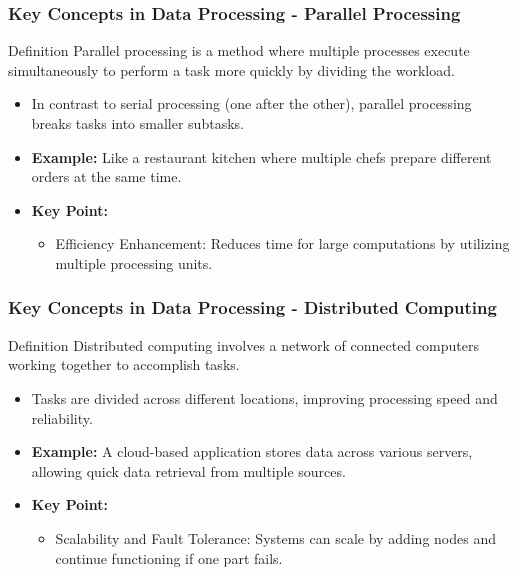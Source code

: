 \documentclass[aspectratio=169]{beamer}
\begin{document}
\begin{frame}[fragile]
    \frametitle{Key Concepts in Data Processing - Parallel Processing}
    \begin{block}{Definition}
        Parallel processing is a method where multiple processes execute simultaneously to perform a task more quickly by dividing the workload.
    \end{block}
    \begin{itemize}
        \item In contrast to serial processing (one after the other), parallel processing breaks tasks into smaller subtasks.
        \item \textbf{Example:} Like a restaurant kitchen where multiple chefs prepare different orders at the same time.
        \item \textbf{Key Point:} 
        \begin{itemize}
            \item Efficiency Enhancement: Reduces time for large computations by utilizing multiple processing units.
        \end{itemize}
    \end{itemize}
\end{frame}

\begin{frame}[fragile]
    \frametitle{Key Concepts in Data Processing - Distributed Computing}
    \begin{block}{Definition}
        Distributed computing involves a network of connected computers working together to accomplish tasks.
    \end{block}
    \begin{itemize}
        \item Tasks are divided across different locations, improving processing speed and reliability.
        \item \textbf{Example:} A cloud-based application stores data across various servers, allowing quick data retrieval from multiple sources.
        \item \textbf{Key Point:}
        \begin{itemize}
            \item Scalability and Fault Tolerance: Systems can scale by adding nodes and continue functioning if one part fails.
        \end{itemize}
    \end{itemize}
\end{frame}
\end{document}
